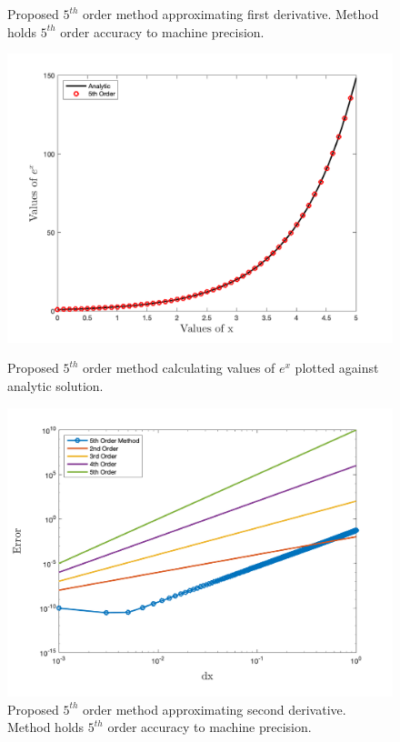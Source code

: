 \begin{figure}[htbp]
\begin{minipage}{0.45\textwidth}
		\caption{Proposed $5^{th}$ order method approximating first derivative. Method holds $5^{th}$ order accuracy to machine precision.}
		\label{fig:1stErr}
	\end{minipage}
\end{figure}
\begin{figure}[htbp]
	\centering
	\begin{minipage}{.45\textwidth}
		\centering
		\includegraphics[width=1.0\linewidth]{figs/2ndDer.png}
		\caption{Proposed $5^{th}$ order method calculating values of $e^x$ plotted against analytic solution.}
		\label{fig:2ndDer}
	\end{minipage}%
\hfill
	\begin{minipage}{0.45\textwidth}
		\centering
		\includegraphics[width=1.0\linewidth]{figs/2ndErr.png}
		\caption{Proposed $5^{th}$ order method approximating second derivative. Method holds $5^{th}$ order accuracy to machine precision.}
		\label{fig:2ndErr}
	\end{minipage}
\end{figure}

